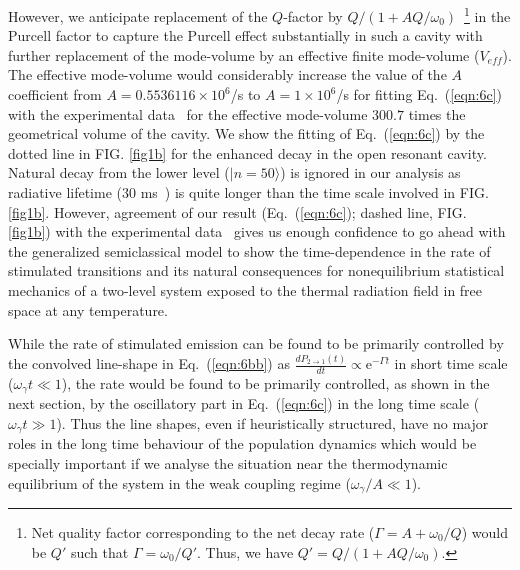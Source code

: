 \documentclass[aps,pra,twocolumn,showpacs,preprintnumbers,amsmath,amssymb,footinbib]{revtex4}
\begin{document}
However, we anticipate  replacement of the $Q$-factor by $Q/(1+AQ/\omega_0)$~\footnote{Net quality factor corresponding to the net decay rate ($\Gamma=A+\omega_0/Q$) would be $Q'$ such that $\Gamma=\omega_0/Q'$. Thus, we have $Q'=Q/(1+AQ/\omega_0)$.} in the Purcell factor to capture the Purcell effect substantially in such a cavity with further replacement of the mode-volume by an effective finite mode-volume ($V_{eff}$). The effective mode-volume would considerably increase the value of the $A$ coefficient from $A=0.5536116\times10^6$/s to $A=1\times10^6$/s for fitting Eq.~(\ref{eqn:6c}) with the experimental data~\cite{Brune} for the effective mode-volume $300.7$ times the geometrical volume of the cavity. We show the fitting of Eq.~(\ref{eqn:6c}) by the dotted line in FIG. \ref{fig1b} for the enhanced decay in the open resonant cavity. Natural decay from the lower level ($|n=50\rangle$) is ignored in our analysis as radiative lifetime ($30$ ms~\cite{Brune}) is quite longer than the time scale involved in FIG. \ref{fig1b}.  However, agreement of our result (Eq.~(\ref{eqn:6c}); dashed line, FIG. \ref{fig1b}) with the experimental data~\cite{Brune} gives us enough confidence to go ahead with the generalized semiclassical model to show the time-dependence in the rate of stimulated transitions and its natural consequences for nonequilibrium statistical mechanics of a two-level system exposed to the thermal radiation field in free space at any temperature.

While the rate of stimulated emission can be found to be primarily controlled by the convolved line-shape in Eq.~(\ref{eqn:6bb}) as $\frac{d P_{2\rightarrow1}(t)}{dt}\propto \text{e}^{-\Gamma t}$ in short time scale ($\omega_\gamma t\ll1$),  the rate would be found to be primarily controlled, as shown in the next section, by the oscillatory part in Eq.~(\ref{eqn:6c}) in the long time scale ($\omega_\gamma t\gg1$). Thus the line shapes, even if  heuristically structured, have no major roles in the long time behaviour of the population dynamics which would be specially important if we analyse the situation near the thermodynamic equilibrium of the system in the weak coupling regime ($\omega_\gamma/A\ll1$).

\end{document}
